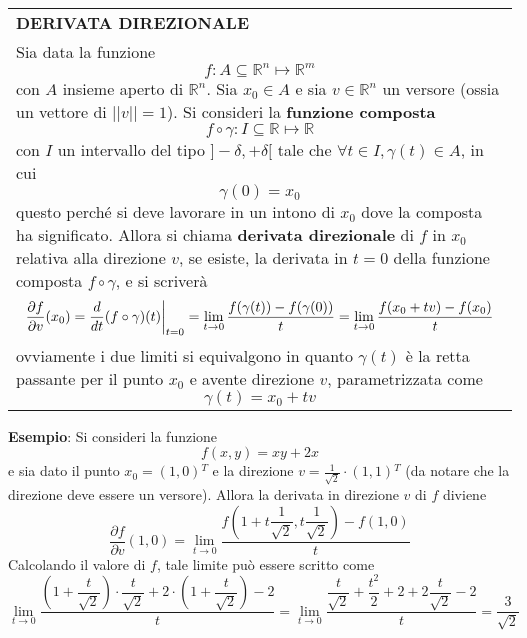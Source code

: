 \documentclass[a4paper]{extarticle}
\renewcommand\arraystretch{}
\newcommand\restr[2]{{%
  \left.\kern-\nulldelimiterspace %
  #1 %
  \vphantom{\big|} %
  \right|_{#2} %
  }}
\begin{document}
\vspace{1em}
\setlength{\tabcolsep}{14pt}
\renewcommand{\arraystretch}{2}
\noindent
\begin{tabularx}{\textwidth}{@{}|P|@{}}
    \hline
    {\textbf{DERIVATA DIREZIONALE}}\\
    \parbox{\linewidth}{Sia data la funzione
    \[f : A \subseteq \mathbb{R}^n \longmapsto \mathbb{R}^m\]
    con $A$ insieme aperto di $\mathbb{R}^n$. Sia $x_0 \in A$ e sia $v \in \mathbb{R}^n$ un versore (ossia un vettore di $\vert \vert v \vert \vert = 1$).\\
    Si consideri la \textbf{funzione composta}
    \[f \circ \gamma : I \subseteq \mathbb{R} \longmapsto \mathbb{R}\]
    con $I$ un intervallo del tipo $]-\delta,+\delta[$ tale che $\forall t \in I, \gamma(t) \in A$, in cui
    \[\gamma(0)=x_0\]
    questo perché si deve lavorare in un intono di $x_0$ dove la composta ha significato.\\
    Allora si chiama \textbf{derivata direzionale} di $f$ in $x_0$ relativa alla direzione $v$, se esiste, la derivata in $t=0$ della funzione composta $f \circ \gamma$, e si scriverà
    \[\frac{\partial f}{\partial v} (x_0) = \restr{\frac{d}{dt} (f \circ \gamma)(t)}{t=0} = \lim_{t \to 0} \frac{f(\gamma(t)) - f(\gamma(0))}{t} = \lim_{t \to 0} \frac{f(x_0+tv) - f(x_0)}{t}\]
    ovviamente i due limiti si equivalgono in quanto $\gamma(t)$ è la retta passante per il punto $x_0$ e avente direzione $v$, parametrizzata come
    \[\gamma(t)=x_0+tv\]
    \vspace{-3mm}}\\
    \hline
\end{tabularx}

\vspace{2em}
\noindent
\textbf{Esempio}: Si consideri la funzione
\[f(x,y)=xy+2x\]
e sia dato il punto $x_0=(1,0){^T}$ e la direzione $\displaystyle{v=\frac{1}{\sqrt{2}} \cdot (1,1){^T}}$ (da notare che la direzione deve essere un versore). Allora la derivata in direzione $v$ di $f$ diviene
\[\frac{\partial f}{\partial v}(1,0) = \lim_{t \to 0} \frac{f\left(1+t \dfrac{1}{\sqrt{2}},t\dfrac{1}{\sqrt{2}}\right) - f(1,0)}{t}\]
Calcolando il valore di $f$, tale limite può essere scritto come
\[\lim_{t \to 0} \dfrac{\left(1+\dfrac{t}{\sqrt{2}}\right) \cdot \dfrac{t}{\sqrt{2}} + 2 \cdot \left(1+\dfrac{t}{\sqrt{2}}\right)-2}{t} = \lim_{t \to 0} \dfrac{\dfrac{t}{\sqrt{2}} + \dfrac{t^2}{2} + 2 + 2 \dfrac{t}{\sqrt{2}}-2}{t} = \dfrac{3}{\sqrt{2}}\]
\end{document}
